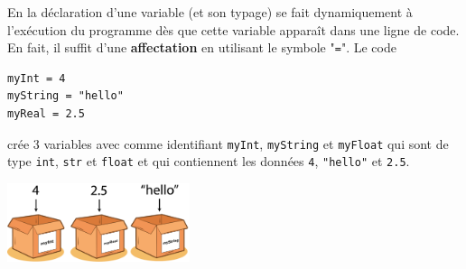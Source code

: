 En \py la déclaration d’une variable (et son typage) se fait dynamiquement à l’exécution du programme dès que cette variable apparaît dans une ligne de code. En fait, il suffit d'une \textbf{affectation} en utilisant le symbole "\lstinline{=}". Le code
\begin{lstlisting}[numbers=none]
myInt = 4
myString = "hello"
myReal = 2.5
\end{lstlisting}
crée 3 variables avec comme identifiant \lstinline{myInt}, \lstinline{myString} et \lstinline{myFloat} qui sont de type \lstinline{int}, \lstinline{str} et \lstinline{float} et qui contiennent les données \lstinline{4}, \lstinline{"hello"} et \lstinline{2.5}. 
\begin{center}
	\includegraphics[trim=0 0 0 45,width=0.4\textwidth]{Images/variables/variables2}
\end{center}

